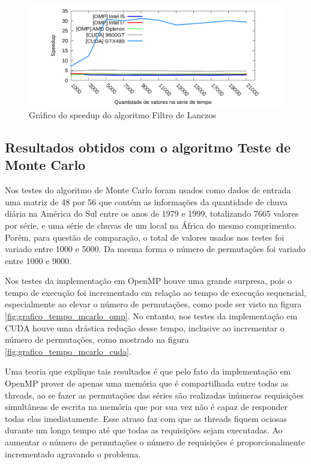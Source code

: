 \begin{figure}[H]
\centering
\includegraphics[width=1.0\textwidth]{Imagens/graficos_lanczos/lanczos_speedup.png}
\caption{Gráfico do speedup do algoritmo Filtro de Lanczos}
\label{fig:grafico_speedup_lanczos}
\end{figure}

\subsection{Resultados obtidos com o algoritmo Teste de Monte Carlo}

Nos testes do algoritmo de Monte Carlo foram usados como dados de entrada uma matriz de 48 por 56 que contém as informações da quantidade de chuva diária na América do Sul entre os anos de 1979 e 1999, totalizando 7665 valores por série, e uma série de chuvas de um local na África do mesmo comprimento.
Porém, para questão de comparação, o total de valores usados nos testes foi variado entre 1000 e 5000. Da mesma forma o número de permutações foi variado entre 1000 e 9000.

Nos testes da implementação em OpenMP houve uma grande surpresa, pois o tempo de execução foi incrementado em relação ao tempo de execução sequencial, especialmente ao elevar o número de permutações, como pode ser visto na figura \ref{fig:grafico_tempo_mcarlo_omp}. No entanto, nos testes da implementação em CUDA houve uma drástica redução desse tempo, inclusive ao incrementar o número de permutações, como mostrado na figura \ref{fig:grafico_tempo_mcarlo_cuda}.

Uma teoria que explique tais resultados é que pelo fato da implementação em OpenMP prover de apenas uma memória que é compartilhada entre todas as threads, ao se fazer as permutações das séries são realizadas inúmeras requisições simultâneas de escrita na memória que por sua vez não é capaz de responder todas elas imediatamente. Esse atraso faz com que as threads fiquem ociosas durante um longo tempo até que todas as requisições sejam executadas. Ao aumentar o número de permutações o número de requisições é proporcionalmente incrementado agravando o problema.

